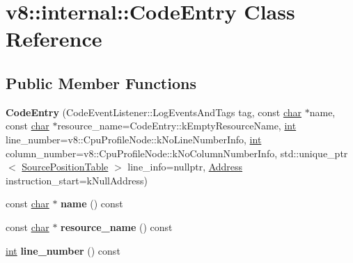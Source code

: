 \hypertarget{classv8_1_1internal_1_1CodeEntry}{}\section{v8\+:\+:internal\+:\+:Code\+Entry Class Reference}
\label{classv8_1_1internal_1_1CodeEntry}
\subsection*{Public Member Functions}
\begin{DoxyCompactItemize}
\item 
\mbox{\label{classv8_1_1internal_1_1CodeEntry_ad063ba8bb9fa8791c460b9a6861c3e73}} 
{\bfseries Code\+Entry} (Code\+Event\+Listener\+::\+Log\+Events\+And\+Tags tag, const \mbox{\hyperlink{classchar}{char}} $\ast$name, const \mbox{\hyperlink{classchar}{char}} $\ast$resource\+\_\+name=Code\+Entry\+::k\+Empty\+Resource\+Name, \mbox{\hyperlink{classint}{int}} line\+\_\+number=v8\+::\+Cpu\+Profile\+Node\+::k\+No\+Line\+Number\+Info, \mbox{\hyperlink{classint}{int}} column\+\_\+number=v8\+::\+Cpu\+Profile\+Node\+::k\+No\+Column\+Number\+Info, std\+::unique\+\_\+ptr$<$ \mbox{\hyperlink{classv8_1_1internal_1_1SourcePositionTable}{Source\+Position\+Table}} $>$ line\+\_\+info=nullptr, \mbox{\hyperlink{classuintptr__t}{Address}} instruction\+\_\+start=k\+Null\+Address)
\item 
\mbox{\label{classv8_1_1internal_1_1CodeEntry_aed597d4719fb67b37a239a67a7ba4e01}} 
const \mbox{\hyperlink{classchar}{char}} $\ast$ {\bfseries name} () const
\item 
\mbox{\label{classv8_1_1internal_1_1CodeEntry_ab2a64634ea78202fe9c64424964653fc}} 
const \mbox{\hyperlink{classchar}{char}} $\ast$ {\bfseries resource\+\_\+name} () const
\item 
\mbox{\label{classv8_1_1internal_1_1CodeEntry_affc328044ac66c290e92ddd9dfc1a685}} 
\mbox{\hyperlink{classint}{int}} {\bfseries line\+\_\+number} () const
\item 
\mbox{\label{classv8_1_1internal_1_1CodeEntry_a63a1aa8187c29f62e5a0a2d75b8de9f4}} 

\end{DoxyCompactItemize}
